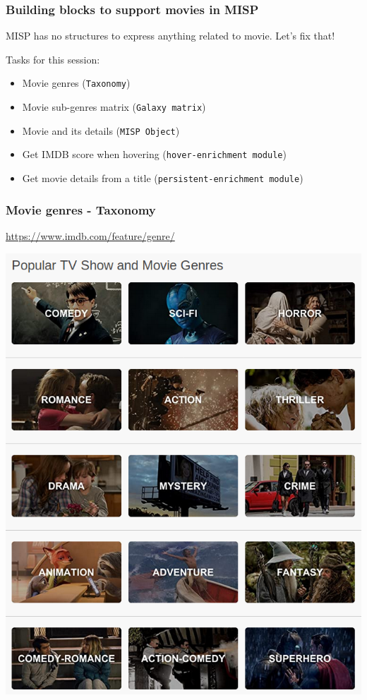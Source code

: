 
\begin{frame}[t,plain]
\titlepage
\end{frame}

\begin{frame}
    \frametitle{Building blocks to support movies in MISP}
    MISP has no structures to express anything related to movie. 
    Let's fix that!
    \pause

    \vspace{1em}
    Tasks for this session:
    \begin{itemize}
        \item Movie genres (\texttt{Taxonomy})
        \item Movie sub-genres matrix (\texttt{Galaxy matrix})
        \item Movie and its details (\texttt{MISP Object})
        \item Get IMDB score when hovering (\texttt{hover-enrichment module})
        \item Get movie details from a title (\texttt{persistent-enrichment module})
    \end{itemize}
\end{frame}

\begin{frame}
    \frametitle{Movie genres - Taxonomy}
    \url{https://www.imdb.com/feature/genre/}
    \begin{center}
        \includegraphics[scale=0.25]{pics/movie-genre}\\
    \end{center}
\end{frame}

